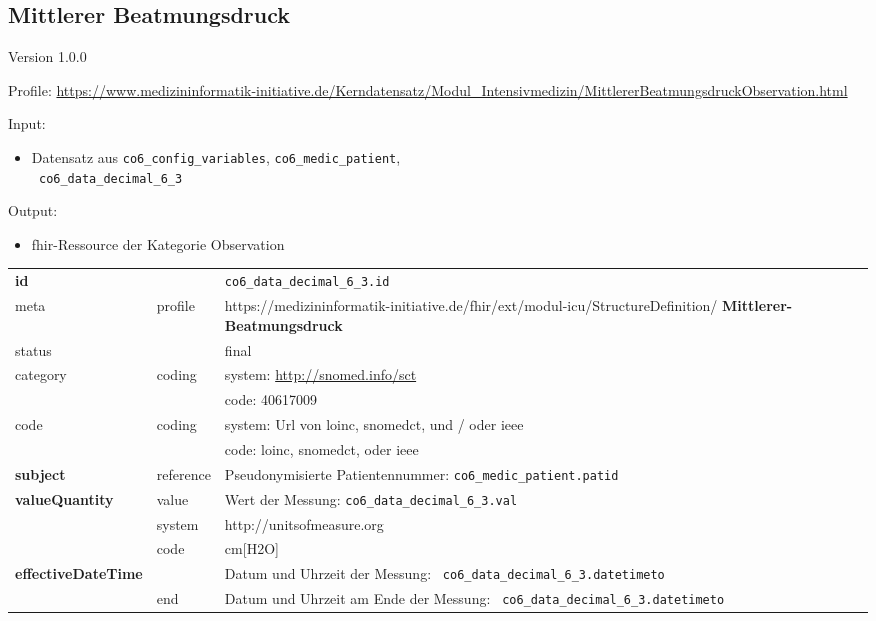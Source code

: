 \subsection{Mittlerer Beatmungsdruck} 
\noindent Version 1.0.0

\noindent Profile: \url{https://www.medizininformatik-initiative.de/Kerndatensatz/Modul_Intensivmedizin/MittlererBeatmungsdruckObservation.html}

\noindent Input:
\begin{itemize}
	\item Datensatz aus \texttt{co6\_config\_variables}, \texttt{co6\_medic\_patient}, \\ \texttt{
co6\_data\_decimal\_6\_3}
\end{itemize}
Output:
\begin{itemize}
        \item \ac{fhir}-Ressource der Kategorie \glqq Observation\grqq{}
\end{itemize}
\begin{longtable}{|l|l|p{7.5cm}|}
        \hline
        \rowcolor{lightgray} \multicolumn{3}{|l|}{Data Mapping (inhaltlich)} \\ \hline
        \textbf{id} &  & \texttt{co6\_data\_decimal\_6\_3.id} \\ \hline
	meta & profile & https://medizininformatik-initiative.de/fhir/ext/modul-icu/StructureDefinition/\textbf{
Mittlerer-Beatmungsdruck} \\ \hline 
	status &  & final   \\ \hline 
	category & coding & system: \url{http://snomed.info/sct} \\
\cline{3-3}
	& & code: 40617009 \\ \hline
	code & coding & system: Url von \ac{loinc}, \ac{snomedct}, und / oder \ac{ieee} \\ 
	\cline{3-3} 
	 &  & code: \ac{loinc}, \ac{snomedct}, oder \ac{ieee} \\ \hline
	 \textbf{subject}  & reference & Pseudonymisierte Patientennummer: \texttt{co6\_medic\_patient.patid} \\ \hline
	 \textbf{valueQuantity}  & value & Wert der Messung: \texttt{co6\_data\_decimal\_6\_3.val} \\
        \cline{2-3}
         & system & http://unitsofmeasure.org \\
         \cline{2-3}
         & code & cm[H2O] \\ \hline
     \textbf{effectiveDateTime}  & & Datum und Uhrzeit der Messung: \texttt{
co6\_data\_decimal\_6\_3.datetimeto} \\
    \cline{2-3}
     & end & Datum und Uhrzeit am Ende der Messung: \texttt{
co6\_data\_decimal\_6\_3.datetimeto} \\ \hline
\end{longtable}


